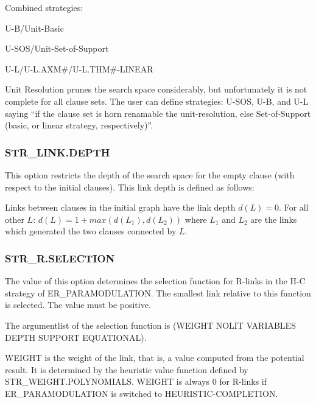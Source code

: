 Combined strategies: 	

U-B/Unit-Basic

U-SOS/Unit-Set-of-Support

U-L/U-L.AXM\#/U-L.THM\#-LINEAR
 
Unit Resolution prunes the search space considerably, but
unfortunately it is not complete for all clause sets. The user can
define strategies: U-SOS, U-B, and U-L saying 	``if
the clause set is horn renamable the unit-resolution, else
Set-of-Support (basic, or linear strategy, respectively)''.



\subsubsection{STR\_LINK.DEPTH}
  

This option restricts the depth of the search space for the empty
clause (with respect to the initial clauses).
This link depth is defined as follows:

	Links between clauses in the initial graph have the link 
depth 	$d(L) = 0$.
	For all other $L$: $d(L) = 1 + max (d(L_1), d(L_2))$ where $L_1$ and 
$L_2$ 	are the links which generated the two clauses connected 
by $L$.

\PO
{}


\subsubsection{STR\_R.SELECTION}
\label{strrselection}
  

The value of this option determines the selection function for R-links
in the H-C strategy of ER\_PA\-RA\-MO\-DU\-LA\-TION. The smallest link relative to this function
is selected. The value must be positive.

The argumentlist of the selection function is
(WEIGHT NOLIT VARIABLES DEPTH SUPPORT EQUATIONAL).

WEIGHT is the weight of the link, that is, a value computed from the
potential result. It is determined by the heuristic value function
defined by STR\_WEIGHT.POLYNOMIALS. WEIGHT is always 0 for R-links 
if ER\_PARAMODULATION is switched to HEURISTIC-COMPLETION. 

